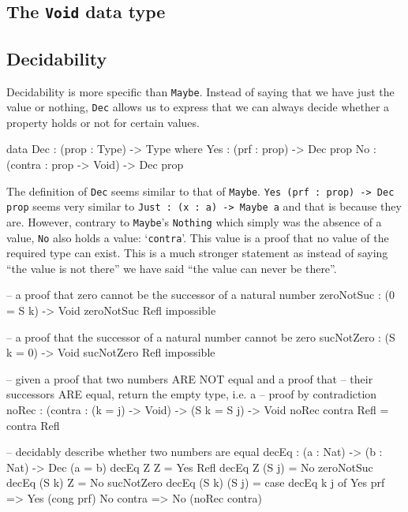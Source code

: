     \subsection{The \texttt{Void} data type}

    \subsection{Decidability}
        Decidability is more specific than \texttt{Maybe}. Instead of saying that we have just the value or nothing, \texttt{Dec} allows us to express that we can always decide whether a property holds or not for certain values.
        
        \begin{code}[caption={\texttt{Dec} as defined in the \Idris prelude}]
            data Dec : (prop : Type) -> Type where
                Yes : (prf : prop) -> Dec prop
                No  : (contra : prop -> Void) -> Dec prop
        \end{code}
        The definition of \texttt{Dec} seems similar to that of \texttt{Maybe}. \texttt{Yes (prf : prop) -> Dec prop} seems very similar to \texttt{Just : (x : a) -> Maybe a} and that is because they are. However, contrary to \texttt{Maybe}'s \texttt{Nothing} which simply was the absence of a value, \texttt{No} also holds a value: `\texttt{contra}'. This value is a proof that no value of the required type can exist. This is a much stronger statement as instead of saying ``the value is not there'' we have said ``the value can never be there''.

	\begin{code}[caption={Proving the equality between natural numbers \cite{brady_2017}},label={lst:decEq}]
    -- a proof that zero cannot be the successor of a natural number
    zeroNotSuc : (0 = S k) -> Void
    zeroNotSuc Refl impossible
    
    -- a proof that the successor of a natural number cannot be zero
    sucNotZero : (S k = 0) -> Void
    sucNotZero Refl impossible
    
    -- given a proof that two numbers ARE NOT equal and a proof that
    -- their successors ARE equal, return the empty type, i.e. a
    -- proof by contradiction
    noRec : (contra : (k = j) -> Void) -> (S k = S j) -> Void
    noRec contra Refl = contra Refl

    -- decidably describe whether two numbers are equal
    decEq : (a : Nat) -> (b : Nat) -> Dec (a = b)
    decEq Z Z = Yes Refl
    decEq Z (S j) = No zeroNotSuc
    decEq (S k) Z = No sucNotZero
    decEq (S k) (S j) = case decEq k j of
                            Yes prf => Yes (cong prf)
                            No contra => No (noRec contra)
	\end{code}

